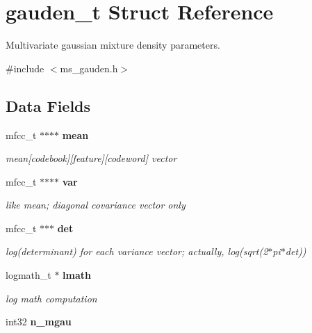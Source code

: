 \section{gauden\+\_\+t Struct Reference}
\label{structgauden__t}


Multivariate gaussian mixture density parameters.  




{\ttfamily \#include $<$ms\+\_\+gauden.\+h$>$}

\subsection*{Data Fields}
\begin{DoxyCompactItemize}
\item 
mfcc\+\_\+t $\ast$$\ast$$\ast$$\ast$ {\bf mean}\label{structgauden__t_aa76d63009601dcb6b99f17db96167f37}

\begin{DoxyCompactList}\small\item\em mean[codebook][feature][codeword] vector \end{DoxyCompactList}\item 
mfcc\+\_\+t $\ast$$\ast$$\ast$$\ast$ {\bf var}\label{structgauden__t_a172cb69c018608ab8c33d54e6f0fdf19}

\begin{DoxyCompactList}\small\item\em like mean; diagonal covariance vector only \end{DoxyCompactList}\item 
mfcc\+\_\+t $\ast$$\ast$$\ast$ {\bf det}\label{structgauden__t_a315918a44ff97b95a6fcdf8739d8089b}

\begin{DoxyCompactList}\small\item\em log(determinant) for each variance vector; actually, log(sqrt(2$\ast$pi$\ast$det)) \end{DoxyCompactList}\item 
logmath\+\_\+t $\ast$ {\bf lmath}\label{structgauden__t_ae05c9b82d8a586bea347681ebe04bb83}

\begin{DoxyCompactList}\small\item\em log math computation \end{DoxyCompactList}\item 
int32 {\bf n\+\_\+mgau}\label{structgauden__t_af15df11bd2f3ab0290e0a33ca15c836c}


\end{DoxyCompactItemize}
